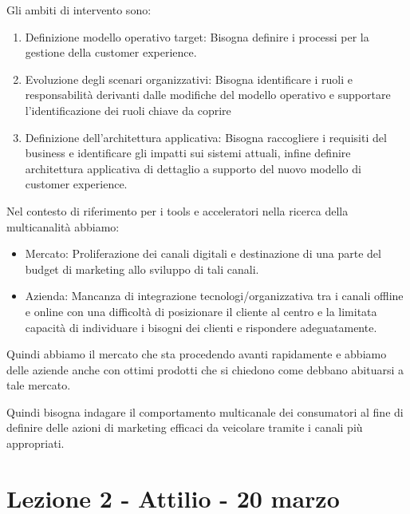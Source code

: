 \documentclass[11pt]{article}
\begin{document}
\noindent Gli ambiti di intervento sono:
\begin{enumerate}[noitemsep,topsep=0ex]
	\item Definizione modello operativo target: Bisogna definire i processi per la gestione della customer experience.
	\item Evoluzione degli scenari organizzativi: Bisogna identificare i ruoli e responsabilità derivanti dalle modifiche del modello operativo e supportare l'identificazione dei ruoli chiave da coprire
	\item Definizione dell'architettura applicativa: Bisogna raccogliere i requisiti del business e identificare gli impatti sui sistemi attuali, infine definire architettura applicativa di dettaglio a supporto del nuovo modello di customer experience.
\end{enumerate}

Nel contesto di riferimento per i tools e acceleratori nella ricerca della multicanalità abbiamo:
\begin{itemize}[noitemsep,topsep=0ex]
	\item Mercato: Proliferazione dei canali digitali e destinazione di una parte del budget di marketing allo sviluppo di tali canali.
	\item Azienda: Mancanza di integrazione tecnologi/organizzativa tra i canali offline e online con una difficoltà di posizionare il cliente al centro e la limitata capacità di individuare i bisogni dei clienti e rispondere adeguatamente.
\end{itemize}
Quindi abbiamo il mercato che sta procedendo avanti rapidamente e abbiamo delle aziende anche con ottimi prodotti che si chiedono come debbano abituarsi a tale mercato.

Quindi bisogna indagare il comportamento multicanale dei consumatori al fine di definire delle azioni di marketing efficaci da veicolare tramite i canali più appropriati.

\section{Lezione 2 - Attilio - 20 marzo} %
\end{document}
